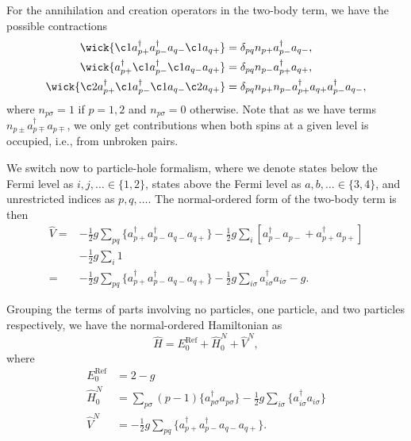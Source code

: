 For the annihilation and creation operators in the two-body term, we have the possible contractions
\begin{align*}
    \wick{
        \c1 a_{p+}^\dagger
        a_{p-}^\dagger
        a_{q-}
        \c1 a_{q+}
    } & = \delta_{pq} n_{p+} a_{p-}^\dagger a_{q-}, \\%
    \wick{
        a_{p+}^\dagger
        \c1 a_{p-}^\dagger
        \c1 a_{q-}
        a_{q+}
    } & = \delta_{pq} n_{p-} a_{p+}^\dagger a_{q+}, \\%
    \wick{
        \c2 a_{p+}^\dagger
        \c1 a_{p-}^\dagger
        \c1 a_{q-}
        \c2 a_{q+}
    } & = \delta_{pq} n_{p+} n_{p-} a_{p+}^\dagger a_{q+} a_{p-}^\dagger a_{q-},
\end{align*}
where $n_{p\sigma} = 1$ if $p = 1, 2$ and $n_{p\sigma} = 0$ otherwise.
Note that as we have terms $n_{p\pm} a_{p\mp}^\dagger a_{p\mp}$, we only get contributions when both spins at a given level is occupied, i.e., from unbroken pairs.

We switch now to particle-hole formalism, where we denote states below the Fermi level as $i, j, \ldots \in \{1, 2\}$, states above the Fermi level as $a, b, \ldots \in \{3, 4\}$, and unrestricted indices as $p, q, \ldots$.
The normal-ordered form of the two-body term is then
\begin{align*}
    \hat{V} =& -\frac{1}{2} g \sum_{pq} \{ a_{p+}^\dagger a_{p-}^\dagger a_{q-} a_{q+} \}
    -\frac{1}{2} g \sum_{i} \left[ a_{p-}^\dagger a_{p-} + a_{p+}^\dagger a_{p+} \right] \\
    &- \frac{1}{2} g \sum_{i} 1 \\
    =& -\frac{1}{2} g \sum_{pq} \{ a_{p+}^\dagger a_{p-}^\dagger a_{q-} a_{q+} \}
    -\frac{1}{2} g \sum_{i \sigma} a_{i\sigma}^\dagger a_{i\sigma}- g.
\end{align*}

Grouping the terms of parts involving no particles, one particle, and two particles respectively, we have the normal-ordered Hamiltonian as
\begin{equation*}
    \hat{H} = E_0^{\text{Ref}} + \hat{H}_0^N + \hat{V}^N,
\end{equation*}
where
\begin{align*}
    E_0^{\text{Ref}} &= 2 - g \\
    \hat{H}_0^N &= \sum_{p\sigma} (p-1) \{ a_{p\sigma}^\dagger a_{p\sigma} \} - \frac{1}{2} g \sum_{i \sigma} \{ a_{i\sigma}^\dagger a_{i\sigma} \} \\
    \hat{V}^N &= -\frac{1}{2} g \sum_{pq} \{ a_{p+}^\dagger a_{p-}^\dagger a_{q-} a_{q+} \}.
\end{align*}

